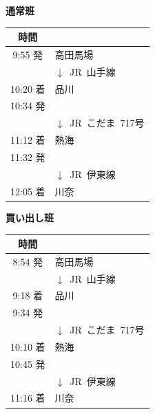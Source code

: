 \documentclass[unicode,a4paper,11pt]{ltjsarticle}
\begin{document}
\begin{center}
  \begin{minipage}[ht]{0.48\columnwidth}
    \textbf{通常班}

    \vspace*{5pt}

    \begin{tabular}{cl}\hline
      時間     &                                 \\ \hline
      9:55 発  & 高田馬場                        \\
               & $\downarrow$\ JR\ 山手線        \\
      10:20 着 & 品川                            \\
      10:34 発 &                                 \\
               & $\downarrow$\ JR\ こだま\ 717号 \\
      11:12 着 & 熱海                            \\
      11:32 発 &                                 \\
               & $\downarrow$\ JR\ 伊東線        \\
      12:05 着 & 川奈                            \\ \hline
    \end{tabular}
  \end{minipage}
  \begin{minipage}[ht]{0.48\columnwidth}
    \textbf{買い出し班}

    \vspace*{5pt}

    \begin{tabular}{cl}\hline
      時間     &                                 \\ \hline
      8:54 発  & 高田馬場                        \\
               & $\downarrow$\ JR\ 山手線        \\
      9:18 着  & 品川                            \\
      9:34 発  &                                 \\
               & $\downarrow$\ JR\ こだま\ 717号 \\
      10:10 着 & 熱海                            \\
      10:45 発 &                                 \\
               & $\downarrow$\ JR\ 伊東線        \\
      11:16 着 & 川奈                            \\ \hline
    \end{tabular}
  \end{minipage}
\end{center}
\end{document}
